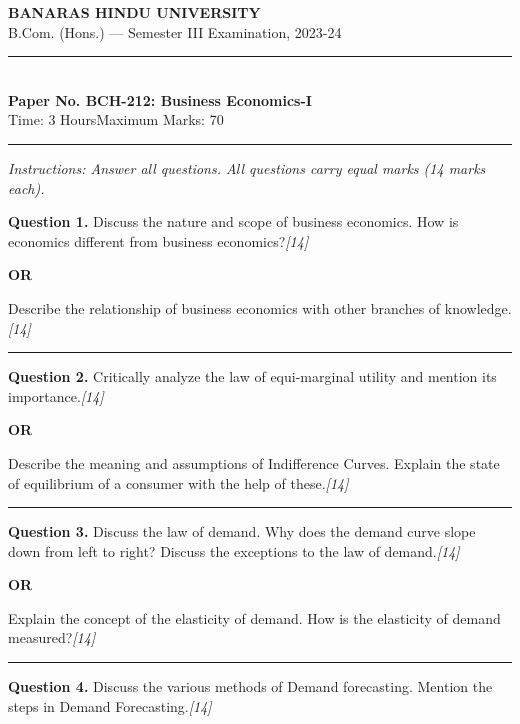 \documentclass[11pt,a4paper]{article}
\newcommand{\pts}[1]{\hfill   \textit{[#1]}}
\begin{document}
\begin{center}
  {\large\bfseries BANARAS HINDU UNIVERSITY}\\[2pt]
  {\normalsize B.Com. (Hons.) --- Semester III Examination, 2023-24}\\[6pt]
  \rule{0.8\linewidth}{0.5pt}\\[6pt]
  {\large\bfseries Paper No. BCH-212: Business Economics-I}\\[4pt]
  {\normalsize Time: 3 Hours\hfill Maximum Marks: 70}
\end{center}

\rule{\linewidth}{0.4pt}

\smallskip



\noindent   \textit{Instructions: Answer all questions. All questions carry equal marks (14 marks each).}

\bigskip




\noindent   \textbf{Question 1.}
Discuss the nature and scope of business economics. How is economics different from business economics?\pts{14}

\centerline{   \textbf{OR}}

Describe the relationship of business economics with other branches of knowledge.\pts{14}

\medskip\rule{\linewidth}{0.2pt}




\noindent   \textbf{Question 2.}
Critically analyze the law of equi-marginal utility and mention its importance.\pts{14}

\centerline{   \textbf{OR}}

Describe the meaning and assumptions of Indifference Curves. Explain the state of equilibrium of a consumer with the help of these.\pts{14}

\medskip\rule{\linewidth}{0.2pt}




\noindent   \textbf{Question 3.}
Discuss the law of demand. Why does the demand curve slope down from left to right? Discuss the exceptions to the law of demand.\pts{14}

\centerline{   \textbf{OR}}

Explain the concept of the elasticity of demand. How is the elasticity of demand measured?\pts{14}

\medskip\rule{\linewidth}{0.2pt}




\noindent   \textbf{Question 4.}
Discuss the various methods of Demand forecasting. Mention the steps in Demand Forecasting.\pts{14}
\end{document}
